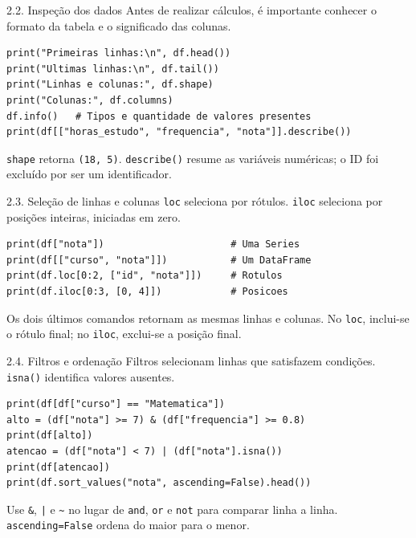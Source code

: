 \begin{frame}[fragile,t]{2.2. Inspeção dos dados}
Antes de realizar cálculos, é importante conhecer o formato da tabela e o significado das colunas.
\begin{lstlisting}
print("Primeiras linhas:\n", df.head())
print("Ultimas linhas:\n", df.tail())
print("Linhas e colunas:", df.shape)
print("Colunas:", df.columns)
df.info()   # Tipos e quantidade de valores presentes
print(df[["horas_estudo", "frequencia", "nota"]].describe())
\end{lstlisting}
\begin{EMASCnote}
\texttt{shape} retorna \texttt{(18, 5)}. \texttt{describe()} resume as variáveis numéricas; o ID foi excluído por ser um identificador.
\end{EMASCnote}
\end{frame}

\begin{frame}[fragile,t]{2.3. Seleção de linhas e colunas}
\texttt{loc} seleciona por rótulos. \texttt{iloc} seleciona por posições inteiras, iniciadas em zero.
\begin{lstlisting}
print(df["nota"])                      # Uma Series
print(df[["curso", "nota"]])           # Um DataFrame
print(df.loc[0:2, ["id", "nota"]])     # Rotulos
print(df.iloc[0:3, [0, 4]])            # Posicoes
\end{lstlisting}
\begin{EMASCnote}
Os dois últimos comandos retornam as mesmas linhas e colunas. No \texttt{loc}, inclui-se o rótulo final; no \texttt{iloc}, exclui-se a posição final.
\end{EMASCnote}
\end{frame}

\begin{frame}[fragile,t]{2.4. Filtros e ordenação}
Filtros selecionam linhas que satisfazem condições. \texttt{isna()} identifica valores ausentes.
\begin{lstlisting}
print(df[df["curso"] == "Matematica"])
alto = (df["nota"] >= 7) & (df["frequencia"] >= 0.8)
print(df[alto])
atencao = (df["nota"] < 7) | (df["nota"].isna())
print(df[atencao])
print(df.sort_values("nota", ascending=False).head())
\end{lstlisting}
\begin{EMASCnote}
Use \texttt{\&}, \texttt{|} e \texttt{\textasciitilde} no lugar de \texttt{and}, \texttt{or} e \texttt{not} para comparar linha a linha. \texttt{ascending=False} ordena do maior para o menor.
\end{EMASCnote}
\end{frame}
